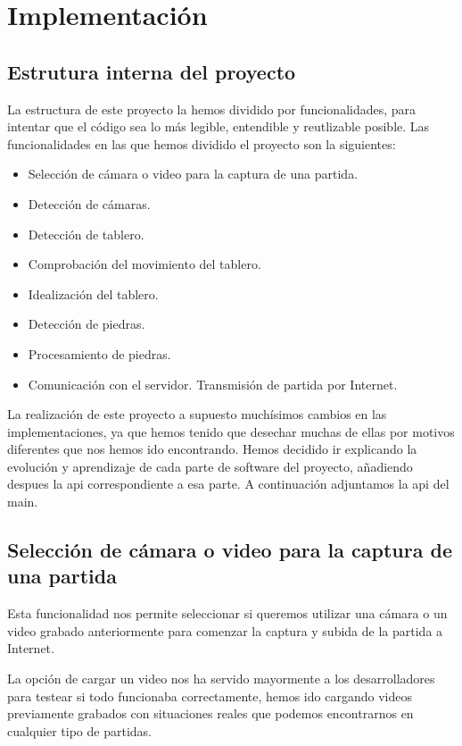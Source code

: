 \documentclass[12pt,a4papert,woside,openright,titlepage,final]{book}
\begin{document}
\chapter{Implementación}

\section{Estrutura interna del proyecto}

La estructura de este proyecto la hemos dividido por funcionalidades, para
intentar que el código sea lo más legible, entendible y reutlizable posible. Las
funcionalidades en las que hemos dividido el proyecto son la siguientes:
\begin{itemize} 
    \item Selección de cámara o video para la captura de una partida.
    \item Detección de cámaras. 
    \item Detección de tablero.
    \item Comprobación del movimiento del tablero.
    \item Idealización del tablero.
    \item Detección de piedras.
    \item Procesamiento de piedras. 
    \item Comunicación con el servidor. Transmisión de partida por Internet.
\end{itemize}

La realización de este proyecto a supuesto muchísimos cambios en las
implementaciones, ya que hemos tenido que desechar muchas de ellas por motivos
diferentes que nos hemos ido encontrando. Hemos decidido ir explicando la
evolución y aprendizaje de cada parte de software del proyecto, añadiendo
despues la api correspondiente a esa parte. A continuación adjuntamos la api del
main.



\section{Selección de cámara o video para la captura de una partida} 

Esta funcionalidad nos permite seleccionar si queremos utilizar una cámara o un
video grabado anteriormente para comenzar la captura y subida de la partida a
Internet.

La opción de cargar un video nos ha servido mayormente a los desarrolladores
para testear si todo funcionaba correctamente, hemos ido cargando videos previamente
grabados con situaciones reales que podemos encontrarnos en cualquier tipo de
partidas.
\end{document}
